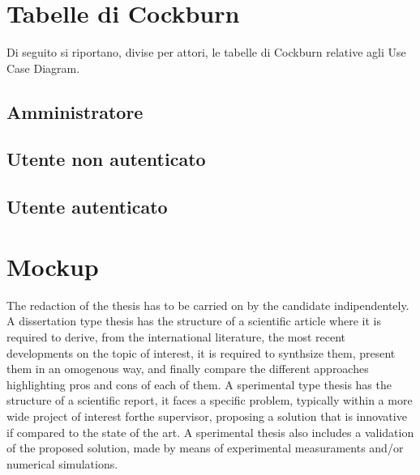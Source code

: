 \section{Tabelle di Cockburn}
Di seguito si riportano, divise per attori, le tabelle di Cockburn relative agli Use Case Diagram.
\subsection{Amministratore}


\pagebreak
\subsection{Utente non autenticato}





\subsection{Utente autenticato}
\pagebreak
\section{Mockup}

The redaction of the thesis has to be carried on by the candidate indipendentely. A dissertation type thesis has the structure of a scientific article where it is required to derive, from the international literature, the most recent developments on the topic of interest, it is required to synthsize them, present them in an omogenous way, and finally compare the different approaches highlighting pros and cons of each of them. A sperimental type thesis has the structure of a scientific report, it faces a specific problem, typically within a more wide project of interest forthe supervisor, proposing a solution that is innovative if compared to the state of the art. A sperimental thesis also includes a validation of the proposed solution, made by means of experimental measuraments and/or numerical simulations.

